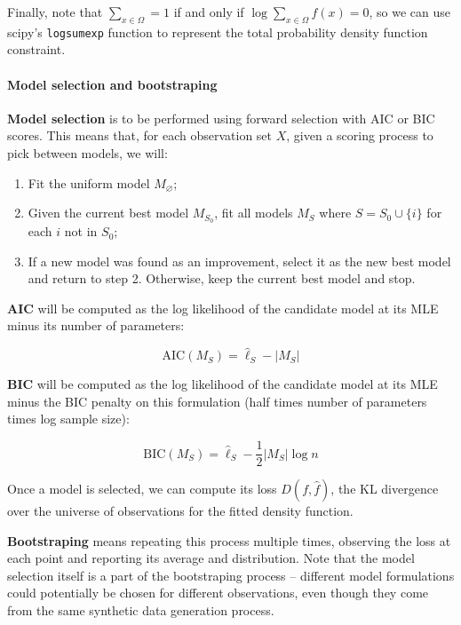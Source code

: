 Finally, note that \(\sum_{x \in \Omega} = 1\) if and only if
\(\log \sum_{x \in \Omega} f(x) = 0\), so we can use scipy's
\texttt{logsumexp} function to represent the total probability density
function constraint.

\paragraph{Model selection and bootstraping}\label{model-selection-and-bootstraping}

\textbf{Model selection} is to be performed using forward selection with
AIC or BIC scores. This means that, for each observation set \(X\),
given a scoring process to pick between models, we will:

\begin{enumerate}[tightlist,label={\arabic*.}]
\item
  Fit the uniform model \(M_\varnothing\);
\item
  Given the current best model \(M_{S_0}\), fit all models \(M_{S}\)
  where \(S = S_0 \cup \{ i \}\) for each \(i\) not in \(S_0\);
\item
  If a new model was found as an improvement, select it as the new best
  model and return to step 2. Otherwise, keep the current best model and
  stop.
\end{enumerate}

\textbf{AIC} will be computed as the log likelihood of the candidate
model at its MLE minus its number of parameters:

\[ \text{AIC}(M_S) = \hat{\ell}_S - |M_S| \]

\textbf{BIC} will be computed as the log likelihood of the candidate
model at its MLE minus the BIC penalty on this formulation (half times
number of parameters times log sample size):

\[ \text{BIC}(M_S) = \hat{\ell}_S - \frac{1}{2} |M_S| \log n \]

Once a model is selected, we can compute its loss \(D(f, \hat{f})\), the
KL divergence over the universe of observations for the fitted density
function.

\textbf{Bootstraping} means repeating this process multiple times,
observing the loss at each point and reporting its average and
distribution. Note that the model selection itself is a part of the
bootstraping process -- different model formulations could potentially
be chosen for different observations, even though they come from the
same synthetic data generation process.

